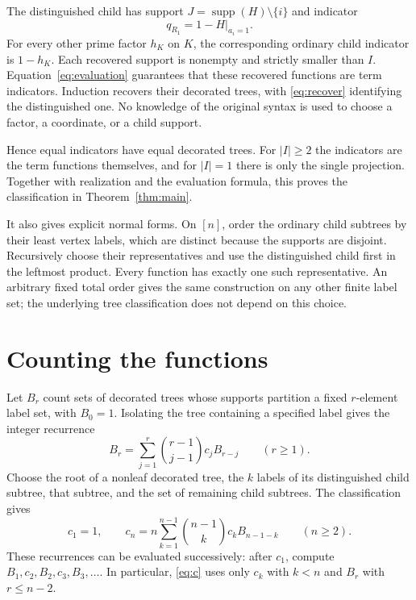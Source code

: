 \documentclass[11pt]{article}
\DeclareMathOperator{\supp}{supp}
\begin{document}
The distinguished child has support $J=\supp(H)\setminus\{i\}$ and
indicator
\begin{equation}\label{eq:recover}
q_{R_1}=1-H|_{a_i=1}.
\end{equation}
For every other prime factor $h_K$ on $K$, the corresponding ordinary
child indicator is $1-h_K$. Each recovered support is nonempty and
strictly smaller than $I$. Equation~\eqref{eq:evaluation} guarantees
that these recovered functions are term indicators. Induction recovers
their decorated trees, with \eqref{eq:recover} identifying the distinguished
one. No knowledge of the original syntax is used to choose a factor,
a coordinate, or a child support.

Hence equal indicators have equal decorated trees. For $|I|\geq2$ the
indicators are the term functions themselves, and for $|I|=1$ there is
only the single projection. Together with realization and the evaluation
formula, this proves the classification in Theorem~\ref{thm:main}.

It also gives explicit normal forms. On $[n]$, order the ordinary child
subtrees by their least vertex labels, which are distinct because the
supports are disjoint. Recursively choose their representatives and use
the distinguished child first in the leftmost product. Every function
has exactly one such representative. An arbitrary fixed total order
gives the same construction on any other finite label set; the underlying
tree classification does not depend on this choice.

\section{Counting the functions}

Let $B_r$ count sets of decorated trees whose supports partition a fixed
$r$-element label set, with $B_0=1$. Isolating the tree containing a
specified label gives the integer recurrence
\begin{equation}\label{eq:B}
B_r=\sum_{j=1}^{r}\binom{r-1}{j-1}c_jB_{r-j}\qquad(r\geq1).
\end{equation}
Choose the root of a nonleaf decorated tree, the $k$ labels of its
distinguished child subtree, that subtree, and the set of remaining
child subtrees. The classification gives
\begin{equation}\label{eq:c}
c_1=1,\qquad
c_n=n\sum_{k=1}^{n-1}\binom{n-1}{k}c_kB_{n-1-k}\qquad(n\geq2).
\end{equation}
These recurrences can be evaluated successively: after $c_1$, compute
$B_1,c_2,B_2,c_3,B_3,\ldots$. In particular, \eqref{eq:c} uses only
$c_k$ with $k<n$ and $B_r$ with $r\leq n-2$.
\end{document}
